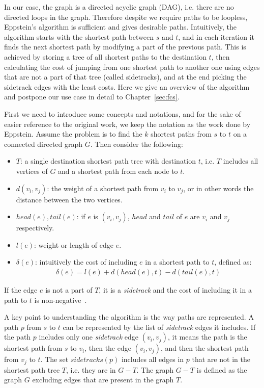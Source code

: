In our case, the graph is a directed acyclic graph (DAG), i.e. there are no directed loops in the graph. Therefore despite we require paths to be loopless, Eppstein's algorithm is sufficient and gives desirable paths.
Intuitively, the algorithm starts with the shortest path between $s$ and $t$, and in each iteration it finds the next shortest path by modifying a part of the previous path. This is achieved by storing a tree of all shortest paths to the destination $t$, then calculating the cost of jumping from one shortest path to another one using edges that are not a part of that tree (called sidetracks), and at the end picking the sidetrack edges with the least costs.
Here we give an overview of the algorithm and postpone our use case in detail to Chapter~\ref{sec:fcs}.

First we need to introduce some concepts and notations, and for the sake of easier reference to the original work, we keep the notation as the work done by Eppstein.
Assume the problem is to find the $k$ shortest paths from $s$ to $t$ on a connected directed graph $G$. Then consider the following:
\begin{itemize}
\item $T$: a single destination shortest path tree with destination $t$, i.e. $T$ includes all vertices of $G$ and a shortest path from each node to $t$.
\item $d(v_i, v_j)$: the weight of a shortest path from $v_i$ to $v_j$, or in other words the distance between the two vertices.
\item $head(e), tail(e)$: if $e$ is $(v_i, v_j)$, $head$ and $tail$ of $e$ are $v_i$ and $v_j$ respectively.
\item $l(e)$: weight or length of edge $e$.
\item $\delta(e)$: intuitively the cost of including $e$ in a shortest path to $t$, defined as:
  \begin{align}
    \delta(e) = l(e) + d(head(e), t) - d(tail(e), t)
  \end{align}
\end{itemize}

If the edge $e$ is not a part of $T$, it is a \emph{sidetrack} and the cost of including it in a path to $t$ is non-negative~\cite[Lemma 1]{eppstein1998finding}.

A key point to understanding the algorithm is the way paths are represented. A path $p$ from $s$ to $t$ can be represented by the list of \emph{sidetrack} edges it includes. If the path $p$ includes only one \emph{sidetrack} edge $(v_i, v_j)$, it means the path is the shortest path from $s$ to $v_i$, then the edge $(v_i, v_j)$, and then the shortest path from $v_j$ to $t$. The set $sidetracks(p)$ includes all edges in $p$ that are not in the shortest path tree $T$, i.e. they are in $G - T$. The graph $G - T$ is defined as the graph $G$ excluding edges that are present in the graph $T$.

